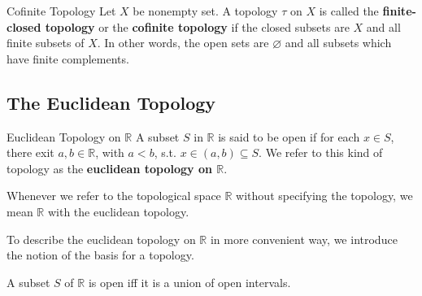 \begin{definition}{Cofinite Topology}{}
    Let $X$ be nonempty set. A topology $\tau$ on $X$ is called the
    \textbf{finite-closed topology} or the \textbf{cofinite topology}
    if the closed subsets are $X$ and all finite subsets of $X$. In
    other words, the open sets are $\varnothing$ and all subsets which
    have finite complements.
\end{definition}

\subsection{The Euclidean Topology}\label{sub:The Euclidean Topology} %

\begin{definition}{Euclidean Topology on $\mathbb{R}$}{}
    A subset $S$ in $\mathbb{R}$ is said to be open if for each $x
    \in S$, there exit $a,b \in \mathbb{R}$, with $a < b$, s.t. $x
    \in (a,b) \subseteq S$. We refer to this kind of topology as the
    \textbf{euclidean topology on $\mathbb{R}$}.
\end{definition}

\begin{remarks}
    Whenever we refer to the topological space $\mathbb{R}$ without
    specifying the
    topology, we mean $\mathbb{R}$ with the euclidean topology.
\end{remarks}

To describe the euclidean topology on $\mathbb{R}$ in more convenient
way, we introduce the notion of the basis for a topology.

\begin{proposition}{}{}
    A subset $S$ of $\mathbb{R}$ is open iff it is a union of open intervals.
\end{proposition}

